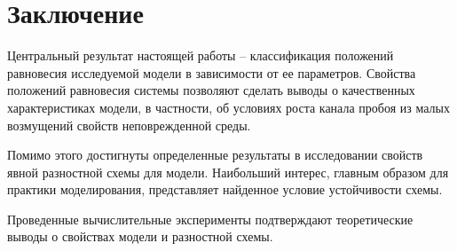 
\section{Заключение}

Центральный результат настоящей работы -- классификация положений равновесия исследуемой модели в зависимости от ее параметров. Свойства положений равновесия системы позволяют сделать выводы о качественных характеристиках модели, в частности, об условиях роста канала пробоя из малых возмущений свойств неповрежденной среды.

Помимо этого достигнуты определенные результаты в исследовании \linebreak свойств явной разностной схемы для модели. Наибольший интерес, главным образом для практики моделирования, представляет найденное условие устойчивости схемы.

Проведенные вычислительные эксперименты подтверждают теоретические выводы о свойствах модели и разностной схемы.